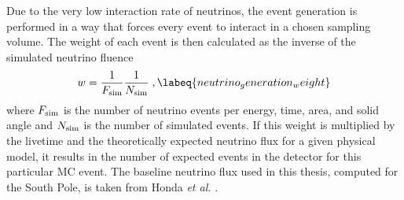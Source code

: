 Due to the very low interaction rate of neutrinos, the event generation is performed in a way that forces every event to interact in a chosen sampling volume. The weight of each event is then calculated as the inverse of the simulated neutrino fluence
\begin{equation}
    w = \frac{1}{F_{\mathrm{sim}}} \frac{1}{N_{\mathrm{sim}}}
    \;,
    \labeq{neutrino_generation_weight}
\end{equation}
where $F_{\rm{sim}}$ is the number of neutrino events per energy, time, area, and solid angle and $N_{\rm{sim}}$ is the number of simulated events. If this weight is multiplied by the livetime and the theoretically expected neutrino flux for a given physical model, it results in the number of expected events in the detector for this particular MC event. The baseline neutrino flux used in this thesis, computed for the South Pole, is taken from Honda \textit{et al.} .

